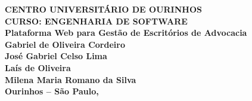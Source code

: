\begin{center}
    \vspace*{1cm}
    {\large\textbf{CENTRO UNIVERSITÁRIO DE OURINHOS}} \\[0.2cm]
    {\large\textbf{CURSO: ENGENHARIA DE SOFTWARE}} \\[5cm]
    {\Large\textbf{Plataforma Web para Gestão de Escritórios de Advocacia}} \\[4cm]
    {\large\textbf{Gabriel de Oliveira Cordeiro}} \\
    {\large\textbf{José Gabriel Celso Lima}} \\
    {\large\textbf{Laís de Oliveira}} \\
    {\large\textbf{Milena Maria Romano da Silva}} \\[1cm]
    \vfill
    {\large\textbf{Ourinhos -- São Paulo, \the\year}}
\end{center}
